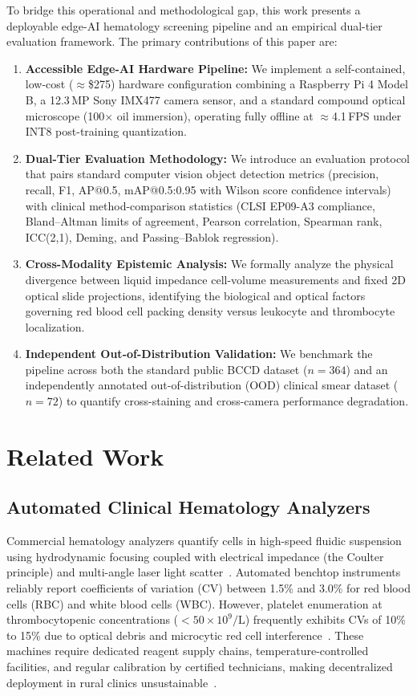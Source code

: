 \documentclass[10pt,conference]{IEEEtran}
\begin{document}
To bridge this operational and methodological gap, this work presents a deployable edge-AI hematology screening pipeline and an empirical dual-tier evaluation framework. The primary contributions of this paper are:
\begin{enumerate}
  \item \textbf{Accessible Edge-AI Hardware Pipeline:} We implement a self-contained, low-cost ($\approx$\$275) hardware configuration combining a Raspberry Pi 4 Model B, a 12.3\,MP Sony IMX477 camera sensor, and a standard compound optical microscope (100$\times$ oil immersion), operating fully offline at $\approx$4.1\,FPS under INT8 post-training quantization.
  \item \textbf{Dual-Tier Evaluation Methodology:} We introduce an evaluation protocol that pairs standard computer vision object detection metrics (precision, recall, F1, AP@0.5, mAP@0.5:0.95 with Wilson score confidence intervals) with clinical method-comparison statistics (CLSI EP09-A3 compliance, Bland--Altman limits of agreement, Pearson correlation, Spearman rank, ICC(2,1), Deming, and Passing--Bablok regression).
  \item \textbf{Cross-Modality Epistemic Analysis:} We formally analyze the physical divergence between liquid impedance cell-volume measurements and fixed 2D optical slide projections, identifying the biological and optical factors governing red blood cell packing density versus leukocyte and thrombocyte localization.
  \item \textbf{Independent Out-of-Distribution Validation:} We benchmark the pipeline across both the standard public BCCD dataset ($n=364$) and an independently annotated out-of-distribution (OOD) clinical smear dataset ($n=72$) to quantify cross-staining and cross-camera performance degradation.
\end{enumerate}

\section{Related Work}
\label{sec:related}

\subsection{Automated Clinical Hematology Analyzers}
Commercial hematology analyzers quantify cells in high-speed fluidic suspension using hydrodynamic focusing coupled with electrical impedance (the Coulter principle) and multi-angle laser light scatter~\cite{sysmex2020, horiba2022}. Automated benchtop instruments reliably report coefficients of variation (CV) between 1.5\% and 3.0\% for red blood cells (RBC) and white blood cells (WBC). However, platelet enumeration at thrombocytopenic concentrations ($<50 \times 10^9/\text{L}$) frequently exhibits CVs of 10\% to 15\% due to optical debris and microcytic red cell interference~\cite{briggs2009}. These machines require dedicated reagent supply chains, temperature-controlled facilities, and regular calibration by certified technicians, making decentralized deployment in rural clinics unsustainable~\cite{who2011}.
\end{document}
